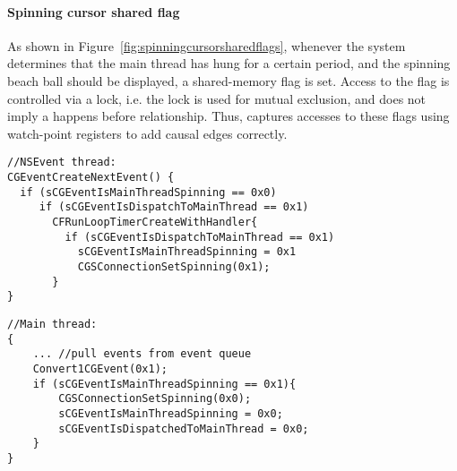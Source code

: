 \paragraph{Spinning cursor shared flag}
As shown in Figure~\ref{fig:spinningcursorsharedflags},
whenever the system determines that the main thread has hung for a certain
period, and the spinning beach ball should be displayed, a shared-memory flag
is set. Access to the flag is controlled via a lock, i.e. the lock is used for
mutual exclusion, and does not imply a happens before relationship. Thus, \xxx
captures accesses to these flags using watch-point registers to add causal edges
correctly.
\begin{figure*}[ht!]
\begin{minipage}[t]{0.5\textwidth}
\begin{lstlisting}
//NSEvent thread:
CGEventCreateNextEvent() {
  if (sCGEventIsMainThreadSpinning == 0x0)
     if (sCGEventIsDispatchToMainThread == 0x1)
       CFRunLoopTimerCreateWithHandler{
         if (sCGEventIsDispatchToMainThread == 0x1)
           sCGEventIsMainThreadSpinning = 0x1
           CGSConnectionSetSpinning(0x1);
       }
}
\end{lstlisting}
\end{minipage}
\begin{minipage}[t]{0.4\textwidth}
\begin{lstlisting}
//Main thread:
{
	... //pull events from event queue
	Convert1CGEvent(0x1);
	if (sCGEventIsMainThreadSpinning == 0x1){
  		CGSConnectionSetSpinning(0x0);
  		sCGEventIsMainThreadSpinning = 0x0;
  		sCGEventIsDispatchedToMainThread = 0x0;
	}
}
\end{lstlisting}
\end{minipage}
    \caption{Spinning Cursor Shared Flags}
    \label{fig:spinningcursorsharedflags}
\end{figure*}
